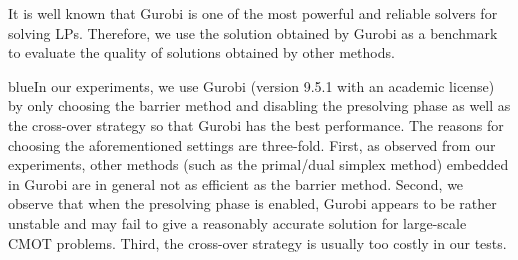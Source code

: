 \documentclass[10pt]{article}
\newcommand{\blue}[1]{\begin{color}{blue}#1\end{color}}
\begin{document}


It is well known that Gurobi is one of the most powerful and reliable solvers for solving LPs. Therefore, we use the solution obtained by Gurobi as a benchmark to evaluate the quality of solutions obtained by other methods. \blue{In our experiments, we use Gurobi (version 9.5.1 with an academic license) by only choosing the barrier method and disabling the presolving phase as well as the cross-over strategy so that Gurobi has the best performance. The reasons for choosing the aforementioned settings are three-fold. First, as observed from our experiments, other methods (such as the primal/dual simplex method) embedded in Gurobi are in general not as efficient as the barrier method. Second, we observe that when the presolving phase is enabled, Gurobi appears to be rather unstable and may fail to give a reasonably accurate solution for large-scale CMOT problems. Third, the cross-over strategy is usually too costly in our tests. }
\end{document}
